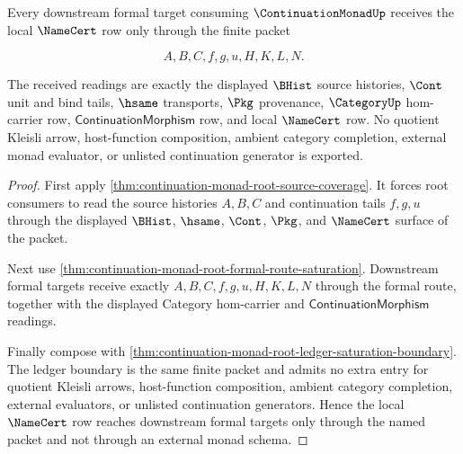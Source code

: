 \begin{theorem}
\label{thm:continuation-monad-root-formal-namecert-handoff}
Every downstream formal target consuming $\ContinuationMonadUp$ receives the local $\NameCert$ row only through the finite packet

$$
A,B,C,f,g,u,H,K,L,N.
$$

The received readings are exactly the displayed $\BHist$ source histories, $\Cont$ unit and bind tails, $\hsame$ transports, $\Pkg$ provenance, $\CategoryUp$ hom-carrier row, $\mathsf{ContinuationMorphism}$ row, and local $\NameCert$ row. No quotient Kleisli arrow, host-function composition, ambient category completion, external monad evaluator, or unlisted continuation generator is exported.
\end{theorem}
\begin{proof}
First apply \autoref{thm:continuation-monad-root-source-coverage}. It forces root consumers to read the source histories $A,B,C$ and continuation tails $f,g,u$ through the displayed $\BHist$, $\hsame$, $\Cont$, $\Pkg$, and $\NameCert$ surface of the packet.

Next use \autoref{thm:continuation-monad-root-formal-route-saturation}. Downstream formal targets receive exactly $A,B,C,f,g,u,H,K,L,N$ through the formal route, together with the displayed Category hom-carrier and $\mathsf{ContinuationMorphism}$ readings.

Finally compose with \autoref{thm:continuation-monad-root-ledger-saturation-boundary}. The ledger boundary is the same finite packet and admits no extra entry for quotient Kleisli arrows, host-function composition, ambient category completion, external evaluators, or unlisted continuation generators. Hence the local $\NameCert$ row reaches downstream formal targets only through the named packet and not through an external monad schema.
\end{proof}


